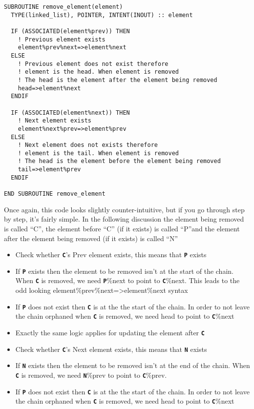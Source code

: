 \documentclass[12pt,a4paper]{article}
\newcommand{\simpleboxverbatim}{\begin{Verbatim}[obeytabs=true,frame=single,
  framerule=0.5mm,rulecolor=\color{warwickmid},formatcom=\color{black}]}
\newcommand{\inlinecode}[1]{{\color{warwickred} \bf\texttt{#1}}}
\begin{document}
\simpleboxverbatim
SUBROUTINE remove_element(element)
  TYPE(linked_list), POINTER, INTENT(INOUT) :: element

  IF (ASSOCIATED(element%prev)) THEN
    ! Previous element exists
    element%prev%next=>element%next
  ELSE
    ! Previous element does not exist therefore
    ! element is the head. When element is removed
    ! The head is the element after the element being removed
    head=>element%next
  ENDIF

  IF (ASSOCIATED(element%next)) THEN
    ! Next element exists
    element%next%prev=>element%prev
  ELSE
    ! Next element does not exists therefore
    ! element is the tail. When element is removed
    ! The head is the element before the element being removed
    tail=>element%prev
  ENDIF

END SUBROUTINE remove_element
\end{Verbatim}

Once again, this code looks slightly counter-intuitive, but if you go through
step by step, it's fairly simple. In the following discussion the element
being removed is called ``C'', the element before ``C'' (if it exists) is
called ``P''and the element after the element being removed (if it exists) is
called ``N''
\begin{itemize}
\item Check whether \inlinecode{C}'s Prev element exists, this means that
  \inlinecode{P} exists
\item If \inlinecode{P} exists then the element to be removed isn't at the
  start of the chain. When \inlinecode{C} is removed, we need
  \inlinecode{P}\%next to point to \inlinecode{C}\%next. This leads to the odd
  looking element\%prev\%next=>element\%next syntax
\item If \inlinecode{P} does not exist then \inlinecode{C} is at the the start
  of the chain. In order to not leave the chain orphaned when \inlinecode{C}
  is removed, we need head to point to \inlinecode{C}\%next
\item Exactly the same logic applies for updating the element after
  \inlinecode{C}
\item Check whether \inlinecode{C}'s Next element exists, this means that
  \inlinecode{N} exists
\item If \inlinecode{N} exists then the element to be removed isn't at the end
  of the chain. When \inlinecode{C} is removed, we need \inlinecode{N}\%prev
  to point to \inlinecode{C}\%prev.
\item If \inlinecode{P} does not exist then \inlinecode{C} is at the the start
  of the chain. In order to not leave the chain orphaned when \inlinecode{C}
  is removed, we need head to point to \inlinecode{C}\%next
\end{itemize}
\end{document}
